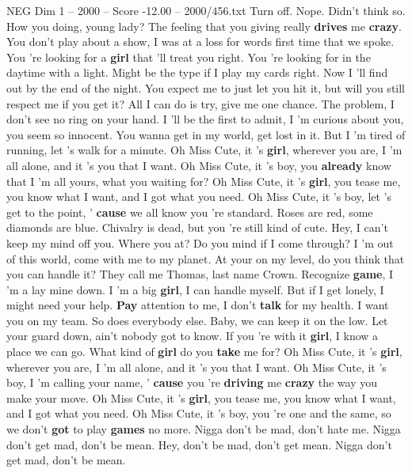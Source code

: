 \begin{textsample}{NEG Dim 1 – 2000 – Score -12.00 – 2000/456.txt}  \label{ex:f1_neg_001}
Turn off.
Nope.
Didn't think so.
How you doing, young lady?
The feeling that you giving really \textbf{drives} me \textbf{crazy}.
You don't play about a show, I was at a loss for words first time that we spoke.
You 're looking for a \textbf{girl} that 'll treat you right.
You 're looking for in the daytime with a light.
Might be the type if I play my cards right.
Now I 'll find out by the end of the night.
You expect me to just let you hit it, but will you still respect me if you get it?
All I can do is try, give me one chance.
The problem, I don't see no ring on your hand.
I 'll be the first to admit, I 'm curious about you, you seem so innocent.
You wanna get in my world, get lost in it.
But I 'm tired of running, let 's walk for a minute.
Oh Miss Cute, it 's \textbf{girl}, wherever you are, I 'm all alone, and it 's you that I want.
Oh Miss Cute, it 's boy, you \textbf{already} know that I 'm all yours, what you waiting for?
Oh Miss Cute, it 's \textbf{girl}, you tease me, you know what I want, and I got what you need.
Oh Miss Cute, it 's boy, let 's get to the point, ' \textbf{cause} we all know you 're standard.
Roses are red, some diamonds are blue.
Chivalry is dead, but you 're still kind of cute.
Hey, I can't keep my mind off you.
Where you at?
Do you mind if I come through?
I 'm out of this world, come with me to my planet.
At your on my level, do you think that you can handle it?
They call me Thomas, last name Crown.
Recognize \textbf{game}, I 'm a lay mine down.
I 'm a big \textbf{girl}, I can handle myself.
But if I get lonely, I might need your help. \textbf{Pay} attention to me, I don't \textbf{talk} for my health.
I want you on my team.
So does everybody else.
Baby, we can keep it on the low.
Let your guard down, ain't nobody got to know.
If you 're with it \textbf{girl}, I know a place we can go.
What kind of \textbf{girl} do you \textbf{take} me for?
Oh Miss Cute, it 's \textbf{girl}, wherever you are, I 'm all alone, and it 's you that I want.
Oh Miss Cute, it 's boy, I 'm calling your name, ' \textbf{cause} you 're \textbf{driving} me \textbf{crazy} the way you make your move.
Oh Miss Cute, it 's \textbf{girl}, you tease me, you know what I want, and I got what you need.
Oh Miss Cute, it 's boy, you 're one and the same, so we don't \textbf{got} to play \textbf{games} no more.
Nigga don't be mad, don't hate me.
Nigga don't get mad, don't be mean.
Hey, don't be mad, don't get mean.
Nigga don't get mad, don't be mean.

\end{textsample}
